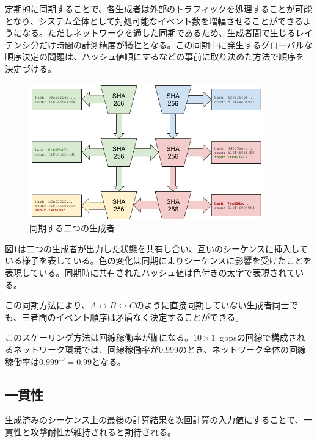 \documentclass[12pt]{ltjsarticle}
\begin{document}
定期的に同期することで、各生成者は外部のトラフィックを処理することが可能となり、システム全体として対処可能なイベント数を増幅させることができるようになる。ただしネットワークを通した同期であるため、生成者間で生じるレイテンシ分だけ時間の計測精度が犠牲となる。この同期中に発生するグローバルな順序決定の問題は、ハッシュ値順にするなどの事前に取り決めた方法で順序を決定づける。

\begin{figure}
  \begin{center}
    \centering
    \includegraphics[width=0.9\textwidth]{../../figures/fig_5.png}
    \caption[Fig 5]{同期する二つの生成者\label{fig:poh_scale}}
  \end{center}
  \end{figure}

図\ref{fig:poh_scale}は二つの生成者が出力した状態を共有し合い、互いのシーケンスに挿入している様子を表している。色の変化は同期によりシーケンスに影響を受けたことを表現している。同期時に共有されたハッシュ値は色付きの太字で表現されている。

この同期方法により、\(A \leftrightarrow B \leftrightarrow C\)のように直接同期していない生成者同士でも、三者間のイベント順序は矛盾なく決定することができる。

このスケーリング方法は回線稼働率が枷になる。$10 \times 1$~gbpsの回線で構成されるネットワーク環境では、回線稼働率が0.999のとき、ネットワーク全体の回線稼働率は\(0.999^{10} = 0.99 \)となる。

\subsection{一貫性}
生成済みのシーケンス上の最後の計算結果を次回計算の入力値にすることで、一貫性と攻撃耐性が維持されると期待される。\\
\end{document}
